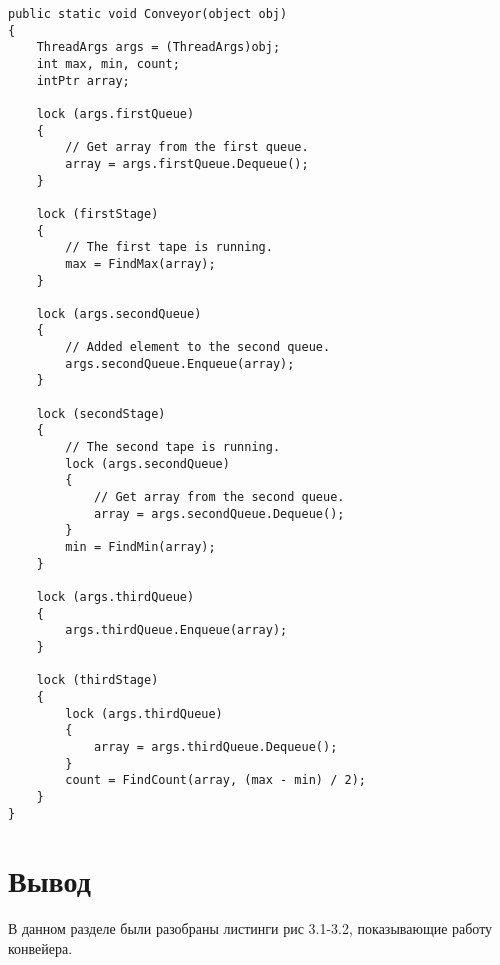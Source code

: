 \begin{lstlisting}[label=some-code,caption=Конвейер]
public static void Conveyor(object obj)
{
	ThreadArgs args = (ThreadArgs)obj;
	int max, min, count;
	intPtr array;

	lock (args.firstQueue)
	{
		// Get array from the first queue.
		array = args.firstQueue.Dequeue();
	}

	lock (firstStage)
	{
		// The first tape is running.
		max = FindMax(array);
	}

	lock (args.secondQueue)
	{
		// Added element to the second queue.
		args.secondQueue.Enqueue(array);
	}

	lock (secondStage)
	{
		// The second tape is running.
		lock (args.secondQueue)
		{
			// Get array from the second queue.
			array = args.secondQueue.Dequeue();
		}
		min = FindMin(array);
	}

	lock (args.thirdQueue)
	{
		args.thirdQueue.Enqueue(array);
	}

	lock (thirdStage)
	{
		lock (args.thirdQueue)
		{
			array = args.thirdQueue.Dequeue();
		}
		count = FindCount(array, (max - min) / 2);
	}
}
\end{lstlisting}



\section{Вывод}

В данном разделе были разобраны листинги рис 3.1-3.2, показывающие работу конвейера.